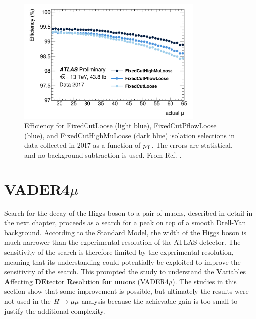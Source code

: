 \begin{figure}[h!]
  \centering
  \includegraphics[width=0.8\textwidth]{figures/muons/newwp}
  \caption[Isolation selection robust to high \pileup~conditions.]
  {Efficiency for FixedCutLoose (light blue), FixedCutPflowLoose
  (blue), and FixedCutHighMuLoose (dark blue) isolation selections
  in data collected in 2017 as a function of $p_{\text{T}}$. The errors are
  statistical, and no background subtraction is used.
  From Ref. \cite{Zgubic:2320874}.}
  \label{fig:muon:newwp}
\end{figure}

\section{VADER4$\mu$}

Search for the decay of the Higgs boson to a pair of muons, described
in detail in the next chapter, proceeds as a search for a peak on top
of a smooth Drell-Yan background. According to the Standard Model,
the width of the Higgs boson is much narrower than the experimental
resolution of the ATLAS detector. The sensitivity of the search is
therefore limited by the experimental resolution, meaning that its
understanding could potentially be exploited
to improve the sensitivity of the search. This prompted the study to
understand the \textbf{V}ariables \textbf{A}ffecting \textbf{DE}tector
\textbf{R}esolution \textbf{for} \textbf{mu}ons (VADER4$\mu$).
The studies in this section show that some improvement is possible,
but ultimately the results were not used in the $H \rightarrow \mu\mu$ analysis
because the achievable gain is too small to justify the additional
complexity.

